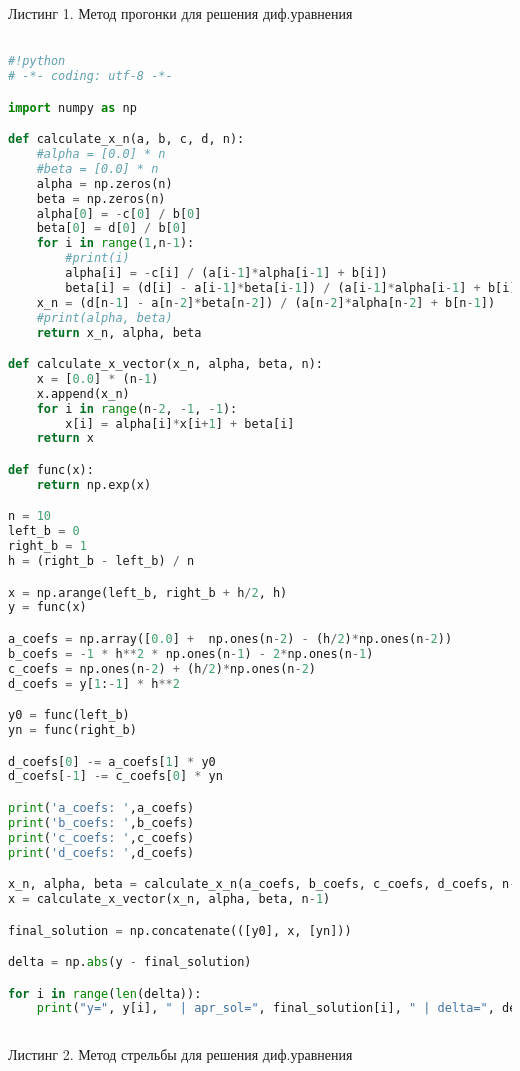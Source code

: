 \documentclass [12pt]{article}
\begin{document}
Листинг 1. Метод прогонки для решения диф.уравнения
\begin{lstlisting}[language=python]

#!python
# -*- coding: utf-8 -*-

import numpy as np

def calculate_x_n(a, b, c, d, n):
    #alpha = [0.0] * n
    #beta = [0.0] * n
    alpha = np.zeros(n)
    beta = np.zeros(n)    
    alpha[0] = -c[0] / b[0]
    beta[0] = d[0] / b[0]
    for i in range(1,n-1):
        #print(i)
        alpha[i] = -c[i] / (a[i-1]*alpha[i-1] + b[i])
        beta[i] = (d[i] - a[i-1]*beta[i-1]) / (a[i-1]*alpha[i-1] + b[i])
    x_n = (d[n-1] - a[n-2]*beta[n-2]) / (a[n-2]*alpha[n-2] + b[n-1])
    #print(alpha, beta)
    return x_n, alpha, beta

def calculate_x_vector(x_n, alpha, beta, n):
    x = [0.0] * (n-1)
    x.append(x_n)
    for i in range(n-2, -1, -1):
        x[i] = alpha[i]*x[i+1] + beta[i]
    return x

def func(x):
    return np.exp(x)

n = 10
left_b = 0
right_b = 1
h = (right_b - left_b) / n

x = np.arange(left_b, right_b + h/2, h)
y = func(x)

a_coefs = np.array([0.0] +  np.ones(n-2) - (h/2)*np.ones(n-2))
b_coefs = -1 * h**2 * np.ones(n-1) - 2*np.ones(n-1)
c_coefs = np.ones(n-2) + (h/2)*np.ones(n-2)
d_coefs = y[1:-1] * h**2 

y0 = func(left_b)
yn = func(right_b)

d_coefs[0] -= a_coefs[1] * y0
d_coefs[-1] -= c_coefs[0] * yn

print('a_coefs: ',a_coefs)
print('b_coefs: ',b_coefs)
print('c_coefs: ',c_coefs)
print('d_coefs: ',d_coefs)

x_n, alpha, beta = calculate_x_n(a_coefs, b_coefs, c_coefs, d_coefs, n-1)
x = calculate_x_vector(x_n, alpha, beta, n-1)

final_solution = np.concatenate(([y0], x, [yn]))

delta = np.abs(y - final_solution)

for i in range(len(delta)):
    print("y=", y[i], " | apr_sol=", final_solution[i], " | delta=", delta[i])
    
\end{lstlisting}

Листинг 2. Метод стрельбы для решения диф.уравнения
\end{document}
